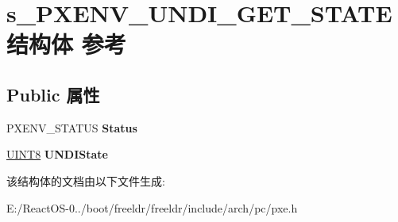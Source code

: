 \hypertarget{structs___p_x_e_n_v___u_n_d_i___g_e_t___s_t_a_t_e}{}\section{s\+\_\+\+P\+X\+E\+N\+V\+\_\+\+U\+N\+D\+I\+\_\+\+G\+E\+T\+\_\+\+S\+T\+A\+T\+E结构体 参考}
\label{structs___p_x_e_n_v___u_n_d_i___g_e_t___s_t_a_t_e}
\subsection*{Public 属性}
\begin{DoxyCompactItemize}
\item 
\mbox{\label{structs___p_x_e_n_v___u_n_d_i___g_e_t___s_t_a_t_e_aa82b18a03c55a1132d74e1b29d8537a5}} 
P\+X\+E\+N\+V\+\_\+\+S\+T\+A\+T\+US {\bfseries Status}
\item 
\mbox{\label{structs___p_x_e_n_v___u_n_d_i___g_e_t___s_t_a_t_e_af33a785360e3f2e246ad311e5c107f66}} 
\hyperlink{_processor_bind_8h_ab27e9918b538ce9d8ca692479b375b6a}{U\+I\+N\+T8} {\bfseries U\+N\+D\+I\+State}
\end{DoxyCompactItemize}


该结构体的文档由以下文件生成\+:\begin{DoxyCompactItemize}
\item 
E\+:/\+React\+O\+S-\/0../boot/freeldr/freeldr/include/arch/pc/pxe.\+h\end{DoxyCompactItemize}
